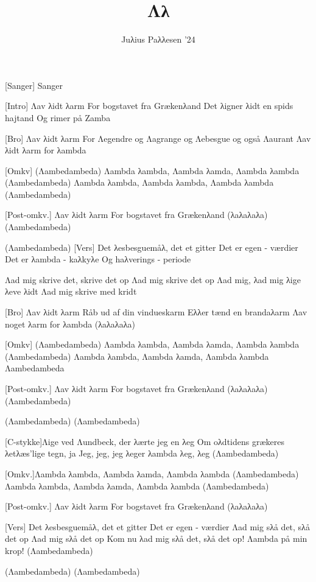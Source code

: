 \documentclass[a4paper,11pt]{article}
\title{Λλ}
\author{Juλius Paλλesen '24}
\begin{document}
\maketitle

\begin{roles}
[Sanger] Sanger
\end{roles}

\begin{song}
    [Intro] Λav λidt λarm
For bogstavet fra Grækenλand
Det λigner λidt en spids hajtand
Og rimer på Zamba

[Bro] Λav λidt λarm
For Λegendre og Λagrange
og Λebesgue og også Λaurant
Λav λidt λarm for λambda

[Omkv] (Λambedambeda) 
Λambda λambda, Λambda λamda, Λambda λambda
(Λambedambeda)
Λambda λambda, Λambda λambda, Λambda λambda
(Λambedambeda)

[Post-omkv.] Λav λidt λarm 
For bogstavet fra Grækenλand (λaλaλaλa)
(Λambedambeda)

(Λambedambeda)
[Vers] Det λesbesguemåλ, det et gitter
Det er egen - værdier
Det er λambda - kaλkyλe
Og haλverings - periode

Λad mig skrive det, skrive det op 
Λad mig skrive det op
Λad mig, λad mig λige λeve λidt
Λad mig skrive med kridt

[Bro] Λav λidt λarm
Råb ud af din vindueskarm 
Eλλer tænd en brandaλarm
Λav noget λarm for λambda (λaλaλaλa)

[Omkv] (Λambedambeda) 
Λambda λambda, Λambda λamda, Λambda λambda
(Λambedambeda)
Λambda λambda, Λambda λamda, Λambda λambda
Λambedambeda

[Post-omkv.] Λav λidt λarm 
For bogstavet fra Grækenλand (λaλaλaλa)
(Λambedambeda)

(Λambedambeda)
(Λambedambeda)

[C-stykke]Λige ved Λundbeck, der λærte jeg en λeg
Om oλdtidens grækeres λetλæs'lige tegn, ja
Jeg, jeg, jeg λeger λambda λeg, λeg
(Λambedambeda)

[Omkv.]Λambda λambda, Λambda λamda, Λambda λambda
(Λambedambeda)
Λambda λambda, Λambda λamda, Λambda λambda
(Λambedambeda)

[Post-omkv.] Λav λidt λarm
For bogstavet fra Grækenλand
(λaλaλaλa)

[Vers] Det λesbesguemåλ, det et gitter
Det er egen - værdier
Λad mig sλå det, sλå det op 
Λad mig sλå det op
Kom nu λad mig sλå det, sλå det op!
Λambda på min krop! 
(Λambedambeda)

(Λambedambeda)
(Λambedambeda)

\end{song}
\end{document}
